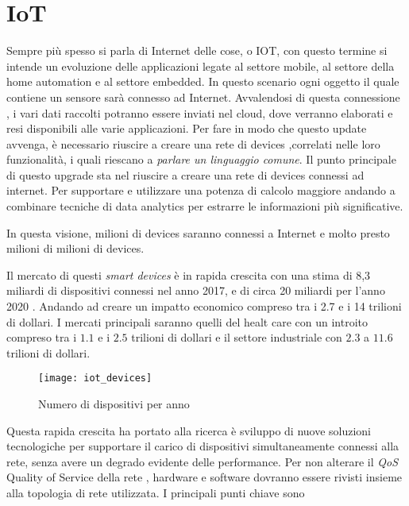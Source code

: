 \section{IoT}
Sempre più spesso si parla di Internet delle cose, o IOT, con questo termine si 
intende un evoluzione delle applicazioni legate al settore mobile, al settore
della home automation e al settore embedded. 
In questo scenario ogni oggetto il
quale contiene un sensore sarà connesso ad Internet. Avvalendosi di questa
connessione , i vari dati raccolti potranno essere inviati nel cloud, dove
verranno elaborati e resi disponibili alle varie applicazioni. 
Per fare in modo che questo update avvenga, è necessario riuscire a creare una
rete di devices ,correlati nelle loro funzionalità, i quali riescano a
\emph{parlare un linguaggio comune}. 
Il punto principale di questo
upgrade sta nel riuscire a creare una rete di devices connessi ad internet. Per
supportare e utilizzare una potenza di calcolo maggiore andando a combinare
tecniche di data analytics per estrarre le informazioni più significative. 

In
questa visione, milioni di devices saranno connessi a Internet e molto presto
milioni di milioni di devices. 

Il mercato di questi \emph{smart devices } è
in rapida crescita con una stima di 8,3 miliardi di dispositivi connessi nel
anno 2017, e di circa 20 miliardi per l'anno 2020 \cite{gartner2016}. Andando ad
creare un impatto economico compreso tra i 2.7 e i 14 trilioni di dollari. I
mercati principali saranno quelli del healt care con un introito compreso tra i
$1.1$ e i $2.5$ trilioni di dollari e il settore industriale con $2.3$ a $11.6$
trilioni di dollari.

\begin{figure}[h]
\centering 
\texttt{[image: iot\_devices]}
\caption{Numero di dispositivi per anno}
\end{figure}

Questa rapida crescita ha portato alla ricerca è sviluppo di nuove soluzioni 
tecnologiche per supportare il carico di dispositivi simultaneamente connessi 
alla rete, senza avere un degrado evidente delle performance.
Per non alterare il \emph{QoS} Quality of Service della rete , hardware e
software dovranno essere rivisti insieme alla topologia di rete utilizzata. I
principali punti chiave sono

